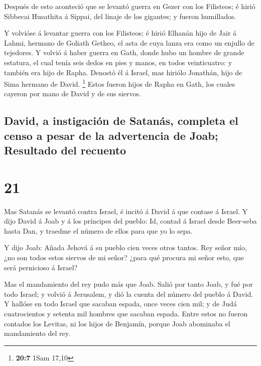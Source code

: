 Después de esto aconteció que se levantó guerra en Gezer
con los Filisteos; é hirió Sibbecai Husathita á Sippai, del linaje de
los gigantes; y fueron humillados.

 Y volvióse á levantar guerra con los Filisteos; é hirió
Elhanán hijo de Jair á Lahmi, hermano de Goliath Getheo, el asta de cuya
lanza era como un enjullo de tejedores.  Y volvió á haber
guerra en Gath, donde hubo un hombre de grande estatura, el cual tenía
seis dedos en pies y manos, en todos veinticuatro: y también era hijo de
Rapha.  Denostó él á Israel, mas hiriólo Jonathán, hijo de
Sima hermano de David. \footnote{\textbf{20:7} 1Sam 17,10} 
Estos fueron hijos de Rapha en Gath, los cuales cayeron por mano de
David y de sus siervos.

\hypertarget{david-a-instigaciuxf3n-de-satanuxe1s-completa-el-censo-a-pesar-de-la-advertencia-de-joab-resultado-del-recuento}{%
\subsection{David, a instigación de Satanás, completa el censo a pesar
de la advertencia de Joab; Resultado del
recuento}\label{david-a-instigaciuxf3n-de-satanuxe1s-completa-el-censo-a-pesar-de-la-advertencia-de-joab-resultado-del-recuento}}

\hypertarget{section-20}{%
\section{21}\label{section-20}}

 Mas Satanás se levantó contra Israel, é incitó á David á
que contase á Israel.  Y dijo David á Joab y á los príncipes
del pueblo: Id, contad á Israel desde Beer-seba hasta Dan, y traedme el
número de ellos para que yo lo sepa.

 Y dijo Joab: Añada Jehová á su pueblo cien veces otros
tantos. Rey señor mío, ¿no son todos estos siervos de mi señor? ¿para
qué procura mi señor esto, que será pernicioso á Israel?

 Mas el mandamiento del rey pudo más que Joab. Salió por
tanto Joab, y fué por todo Israel; y volvió á Jerusalem, y dió la cuenta
del número del pueblo á David.  Y hallóse en todo Israel que
sacaban espada, once veces cien mil; y de Judá cuatrocientos y setenta
mil hombres que sacaban espada.  Entre estos no fueron
contados los Levitas, ni los hijos de Benjamín, porque Joab abominaba el
mandamiento del rey.

